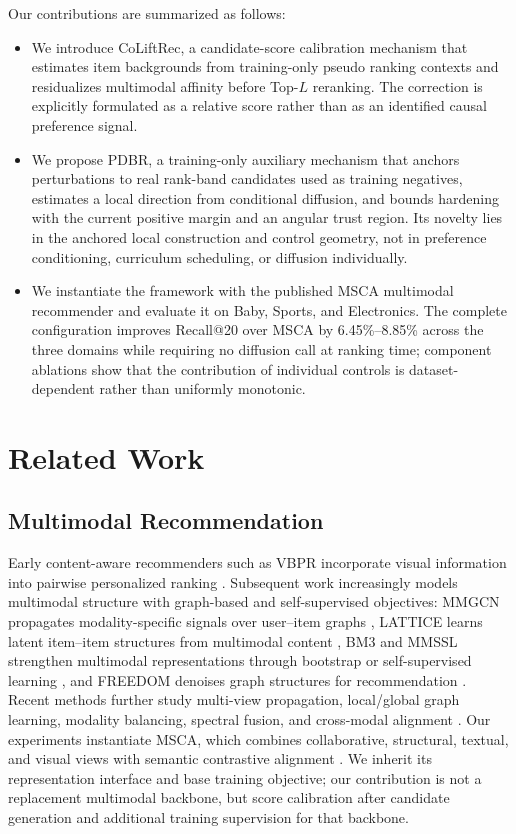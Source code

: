 \documentclass[sigconf,anonymous,review]{acmart}
\newcommand{\methodname}{CoLiftRec}
\newcommand{\pdbr}{PDBR}
\begin{document}
Our contributions are summarized as follows:
\begin{itemize}
    \item We introduce \methodname, a candidate-score calibration mechanism that estimates item backgrounds from training-only pseudo ranking contexts and residualizes multimodal affinity before Top-$L$ reranking. The correction is explicitly formulated as a relative score rather than as an identified causal preference signal.
    \item We propose \pdbr, a training-only auxiliary mechanism that anchors perturbations to real rank-band candidates used as training negatives, estimates a local direction from conditional diffusion, and bounds hardening with the current positive margin and an angular trust region. Its novelty lies in the anchored local construction and control geometry, not in preference conditioning, curriculum scheduling, or diffusion individually.
    \item We instantiate the framework with the published MSCA multimodal recommender \cite{li2026msca} and evaluate it on Baby, Sports, and Electronics. The complete configuration improves Recall@20 over MSCA by 6.45\%--8.85\% across the three domains while requiring no diffusion call at ranking time; component ablations show that the contribution of individual controls is dataset-dependent rather than uniformly monotonic.
\end{itemize}

\section{Related Work}
\label{sec:related}

\subsection{Multimodal Recommendation}

Early content-aware recommenders such as VBPR incorporate visual information into pairwise personalized ranking \cite{he2016vbpr}.
Subsequent work increasingly models multimodal structure with graph-based and self-supervised objectives: MMGCN propagates modality-specific signals over user--item graphs \cite{wei2019mmgcn}, LATTICE learns latent item--item structures from multimodal content \cite{zhang2021lattice}, BM3 and MMSSL strengthen multimodal representations through bootstrap or self-supervised learning \cite{zhou2023bm3,wei2023mmssl}, and FREEDOM denoises graph structures for recommendation \cite{zhou2023freedom}.
Recent methods further study multi-view propagation, local/global graph learning, modality balancing, spectral fusion, and cross-modal alignment \cite{yu2023mgcn,guo2024lgmrec,zhang2024modalitybalanced,ong2025smore,cao2025otrec,xu2025cohesion}.
Our experiments instantiate MSCA, which combines collaborative, structural, textual, and visual views with semantic contrastive alignment \cite{li2026msca}.
We inherit its representation interface and base training objective; our contribution is not a replacement multimodal backbone, but score calibration after candidate generation and additional training supervision for that backbone.
\end{document}
